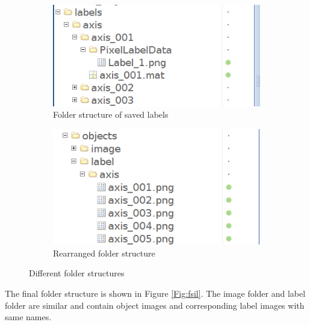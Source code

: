 \begin{center}
	\begin{figure}
		\begin{subfigure}{.5\textwidth}
			\centering
			\includegraphics[width=1\linewidth]{images/folder_structure}
			\caption{Folder structure of saved labels}
			\label{Fig:fsa}
		\end{subfigure}
		\begin{subfigure}{.5\textwidth}
			\centering
			\includegraphics[width=1\linewidth]{images/folder_structure_aug}
			\caption{Rearranged folder structure}
			\label{Fig:fsb}
		\end{subfigure}
		\caption{Different folder structures}
		\label{Fig:fs}
	\end{figure}
\end{center}

The final folder structure is shown in Figure \ref{Fig:fsil}. The image folder and label folder are similar and contain object images and corresponding label images with same names.

